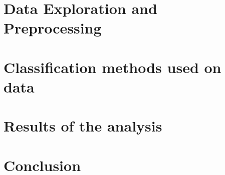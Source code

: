 \documentclass{article}
\numberwithin{equation}{section}
\theoremstyle{definition}
\theoremstyle{plain}
\theoremstyle{definition}
\theoremstyle{remark}
\begin{document}
\section{Data Exploration and Preprocessing}

\section{Classification methods used on data}
\label{classification_theory}

\section{Results of the analysis}
\label{results}


\section{Conclusion}
\label{concl}
\end{document}
